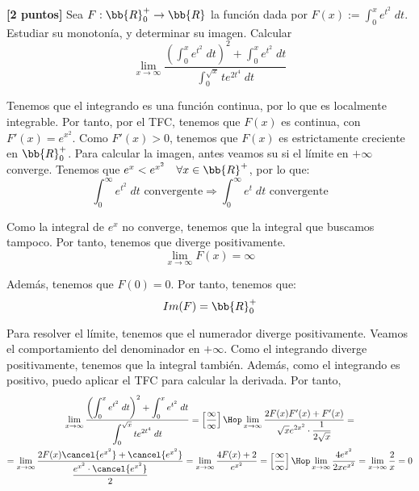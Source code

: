\documentclass[12pt]{article}
\begin{document}
\begin{ejercicio}\textbf{[2 puntos]} Sea $F:\bb{R}^+_0\to \bb{R}$ la función dada por $F(x):=\int_0^x e^{t^2}\;dt$. Estudiar su monotonía, y determinar su imagen. Calcular
\begin{equation*}
    \lim_{x\to \infty} \frac{\displaystyle \left(\int_0^x e^{t^2}\;dt\right)^2+\int_0^x e^{t^2}\;dt}{\displaystyle \int_0^{\sqrt{x}} te^{2t^4}\;dt}
\end{equation*}

Tenemos que el integrando es una función continua, por lo que es localmente integrable. Por tanto, por el TFC, tenemos que $F(x)$ es continua, con $F'(x)=e^{x^2}$. Como $F'(x)>0$, tenemos que $F(x)$ es estrictamente creciente en $\bb{R}^+_0$. Para calcular la imagen, antes veamos su si el límite en $+\infty$ converge. Tenemos que $e^x < e^{x^2} \quad \forall x\in \bb{R}^+$, por lo que:
\begin{equation*}
    \int_0^\infty e^{t^2}\;dt \text{ convergente} \Longrightarrow
    \int_0^\infty e^{t}\;dt \text{ convergente}
\end{equation*}

Como la integral de $e^x$ no converge, tenemos que la integral que buscamos tampoco. Por tanto, tenemos que diverge positivamente.
\begin{equation*}
    \lim_{x\to \infty} F(x)=\infty
\end{equation*}

Además, tenemos que $F(0)=0$. Por tanto, tenemos que:
\begin{equation*}
    Im(F)=\bb{R}^+_0
\end{equation*}

\hspace{1cm}

Para resolver el límite, tenemos que el numerador diverge positivamente. Veamos el comportamiento del denominador en $+\infty$. Como el integrando diverge positivamente, tenemos que la integral también. Además, como el integrando es positivo, puedo aplicar el TFC para calcular la derivada. Por tanto,
\begin{multline*}
    \lim_{x\to \infty} \frac{\displaystyle \left(\int_0^x e^{t^2}\;dt\right)^2+\int_0^x e^{t^2}\;dt}{\displaystyle \int_0^{\sqrt{x}} te^{2t^4}\;dt}
    = \left[\frac{\infty}{\infty}\right]
    \Hop
    \lim_{x\to \infty} \frac{2F(x)F'(x) + F'(x)}{\displaystyle \sqrt{x}e^{2x^2}\cdot \frac{1}{2\sqrt{x}}}
    =\\= \lim_{x\to \infty} \frac{2F(x)\cancel{e^{x^2}} + \cancel{e^{x^2}}}{\displaystyle \frac{e^{x^2}\cdot \cancel{e^{x^2}}}{2}}
    = \lim_{x\to \infty} \frac{4F(x)+2}{e^{x^2}}
    = \left[\frac{\infty}{\infty}\right]
    \Hop
    \lim_{x\to \infty} \frac{4e^{x^2}}{2xe^{x^2}}
    = \lim_{x\to \infty} \frac{2}{x} = 0
\end{multline*}
    
\end{ejercicio}
\end{document}
